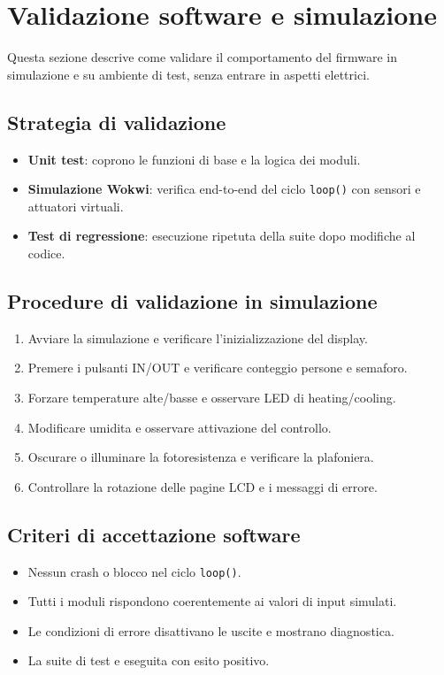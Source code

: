 \chapter{Validazione software e simulazione}

Questa sezione descrive come validare il comportamento del firmware in simulazione e su ambiente di test, senza entrare in aspetti elettrici.

\section{Strategia di validazione}
\begin{itemize}
  \item \textbf{Unit test}: coprono le funzioni di base e la logica dei moduli.
  \item \textbf{Simulazione Wokwi}: verifica end-to-end del ciclo \texttt{loop()} con sensori e attuatori virtuali.
  \item \textbf{Test di regressione}: esecuzione ripetuta della suite dopo modifiche al codice.
\end{itemize}

\section{Procedure di validazione in simulazione}
\begin{enumerate}
  \item Avviare la simulazione e verificare l'inizializzazione del display.
  \item Premere i pulsanti IN/OUT e verificare conteggio persone e semaforo.
  \item Forzare temperature alte/basse e osservare LED di heating/cooling.
  \item Modificare umidita e osservare attivazione del controllo.
  \item Oscurare o illuminare la fotoresistenza e verificare la plafoniera.
  \item Controllare la rotazione delle pagine LCD e i messaggi di errore.
\end{enumerate}

\section{Criteri di accettazione software}
\begin{itemize}
  \item Nessun crash o blocco nel ciclo \texttt{loop()}.
  \item Tutti i moduli rispondono coerentemente ai valori di input simulati.
  \item Le condizioni di errore disattivano le uscite e mostrano diagnostica.
  \item La suite di test e eseguita con esito positivo.
\end{itemize}
